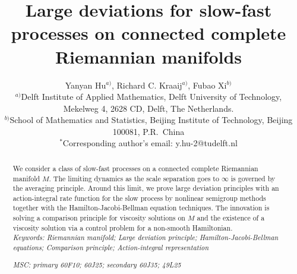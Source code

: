 \documentclass[a4paper]{article}
\title{Large deviations for slow-fast processes on connected complete Riemannian manifolds}
\author{
	{Yanyan Hu$^{a)}$, Richard C. Kraaij$^{a)}$, Fubao Xi$^{b)}$}\\
\footnotesize$^{a)}${Delft Institute of Applied Mathematics, Delft University of Technology,}\\
\footnotesize{Mekelweg 4, 2628 CD,  Delft, The Netherlands.} \\
\footnotesize$^{b)}${School of Mathematics and Statistics, Beijing Institute of Technology, Beijing 100081, P.R.\ China}\\
\footnotesize$^{*}${Corresponding author's email: y.hu-2@tudelft.nl}%
}
\date{}
\numberwithin{equation}{section}
\theoremstyle{definition}
\begin{document}
\maketitle
\begin{abstract}
We consider a class of slow-fast processes on a connected complete Riemannian manifold $M$.
The limiting dynamics as the scale separation goes to $\infty$ is governed by the averaging principle. Around this limit, we prove large deviation principles with an action-integral rate function for the slow process by nonlinear semigroup methods together with the Hamilton-Jacobi-Bellman equation techniques. The innovation is solving a comparison principle for viscosity solutions on $M$ and the existence of a viscosity solution via a control problem for a non-smooth Hamiltonian.
\\[0.2cm]
\noindent 
\emph{Keywords: Riemannian manifold; Large deviation principle; Hamilton-Jacobi-Bellman equations; Comparison principle; Action-integral representation} 

\noindent \emph{MSC: primary 60F10; 60J25; secondary 60J35; 49L25} 
\end{abstract}








\end{document}
